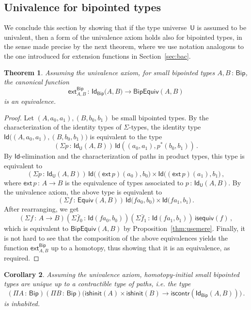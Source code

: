 \documentclass[10pt,a4paper,oneside,reqno]{amsart}
\numberwithin{equation}{section}
\theoremstyle{mythm}
\newtheorem{theorem}{Theorem}[section]
\newtheorem{corollary}[theorem]{Corollary}
\theoremstyle{mydef}
\theoremstyle{myrmk}
\newcommand{\co}{\,{:}\,}
\newcommand{\iscontr}{\mathsf{iscontr}}
\newcommand{\isequiv}{\mathsf{isequiv}}
\newcommand{\isbiphinit}{\mathsf{ishinit}}
\newcommand{\Eq}{\mathsf{Equiv}}
\newcommand{\ext}{\mathsf{ext}}
\newcommand{\Id}{\mathsf{Id}}
\newcommand{\U}{\mathsf{U}}
\newcommand{\Bip}{\mathsf{Bip}}
\newcommand{\BipEquiv}{\mathsf{BipEquiv}}
\begin{document}
\subsection*{Univalence for bipointed types} \label{sec:unibip}
We conclude this section by showing that if the type universe~$\U$ is assumed to be univalent, then a form of the univalence axiom holds also for bipointed types, in the sense made precise by the next theorem, where we
use notation analogous to the one introduced for extension functions in Section~\ref{sec:bac}. 


\begin{theorem}  \label{thm:bipunivalence} Assuming the univalence axiom, 
for small bipointed types $A, B \co \Bip$, the  canonical function
\[ 
\ext^{\Bip}_{A,B} \co \Id_{\Bip} \big(A,B\big) \to  \BipEquiv(A,B) 
\] 
is an equivalence.
\end{theorem} 

\begin{proof} 
Let $ (A,a_0,a_1), (B,b_0,b_1)$ be small bipointed types. By the characterization of the identity types
of $\Sigma$-types, the 
identity type $\Id\big( (A,a_0,a_1),  (B,b_0,b_1)\big)$ is equivalent to  the type
\[
(\Sigma p \co \Id_\U(A,B))  \, \Id(( a_0,a_1 ),  p^* ( b_0,b_1))  \, .
\]
By $\Id$-elimination and the characterization of paths in product types, this type is equivalent to
\[ 
(\Sigma p \co \Id_\U(A,B)) \, \Id \big( (\ext \, p)(a_0),  b_0\big) \times \Id \big( (\ext \, p)(a_1) , b_1) \, ,
 \]
where $\ext \, p \co A \to B$ is the equivalence of types associated to $p \co \Id_\U(A,B)$.  By the univalence axiom,
the above type is equivalent to
\[ 
(\Sigma f \co \Eq(A,B)) \, \Id \big( f a_0 ,  b_0\big) \times \Id \big( f a_1 , b_1\big)  \, .
\]
After rearranging, we get
\[
(\Sigma f  \co A \to B)(\Sigma \bar{f}_0 \co \Id( fa_0, b_0)) (\Sigma \bar{f}_1 \co \Id( fa_1, b_1))  \, \isequiv(f) \, ,
\]
which is equivalent to $\BipEquiv(A,B)$ by Proposition~\ref{thm:usemere}. Finally, it is not hard to see that the composition of the above equivalences yields the  function $\ext^{\Bip}_{A,B}$ up to a homotopy, thus showing that it is an equivalence, as required.
\end{proof} 

\begin{corollary} \label{BoolHInitIso} 
Assuming the univalence axiom, 
homotopy-initial small bipointed types are unique up to a contractible type of paths, i.e. the type
\[ 
(\Pi A \co \Bip) (\Pi B \co \Bip)
\big( \isbiphinit(A) \times \isbiphinit(B) \to \iscontr(\Id_\Bip(A,B)) \big) \, .
\] 
is inhabited.
\end{corollary}
\end{document}
